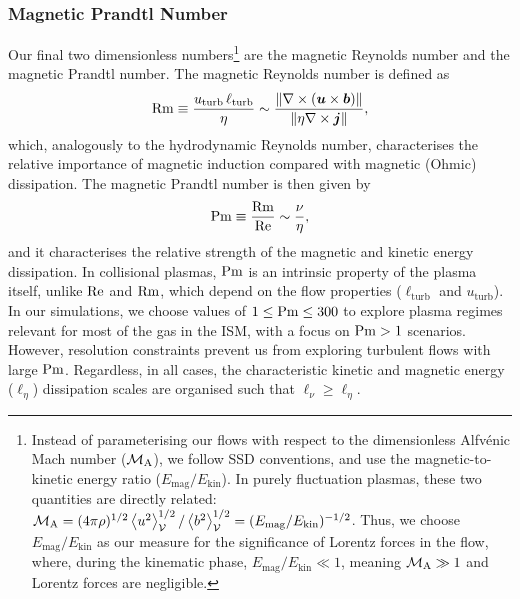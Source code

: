 \subsubsection{Magnetic Prandtl Number}
\label{sec:ICs:Pm}

Our final two dimensionless numbers\footnote{
    Instead of parameterising our flows with respect to the dimensionless Alfv\'enic Mach number ($\mathcal{M}_{\mathrm{A}}$), we follow SSD conventions, and use the magnetic-to-kinetic energy ratio ($E_\mathrm{mag} / E_\mathrm{kin}$). In purely fluctuation plasmas, these two quantities are directly related: $\mathcal{M}_{\mathrm{A}} = (4\pi \rho)^{1/2} \left\langle u^2 \right\rangle_{\mathcal{V}}^{1/2} / \left\langle b^2 \right\rangle_{\mathcal{V}}^{1/2} = (E_\mathrm{mag} / E_\mathrm{kin})^{-1/2}$. Thus, we choose $E_\mathrm{mag} / E_\mathrm{kin}$ as our measure for the significance of Lorentz forces in the flow, where, during the kinematic phase, $E_\mathrm{mag} / E_\mathrm{kin} \ll 1$, meaning $\mathcal{M}_{\mathrm{A}} \gg 1$ and Lorentz forces are negligible.
} are the magnetic Reynolds number and the magnetic Prandtl number. The magnetic Reynolds number is defined as
\begin{align}
    \mathrm{Rm}
        \equiv \frac{u_\mathrm{turb} \,\ell_\mathrm{turb}}{\eta}
        \sim \frac{
                \|\nabla\times(\bm{u}\times\bm{b})\|
            }{
                \|\eta\nabla\times\bm{j}\|
            }
        , \label{dfn:Reym}
\end{align}
which, analogously to the hydrodynamic Reynolds number, characterises the relative importance of magnetic induction compared with magnetic (Ohmic) dissipation. The magnetic Prandtl number is then given by
\begin{align}
    \mathrm{Pm}
        \equiv \frac{\mathrm{Rm}}{\mathrm{Re}}
        \sim \frac{\nu}{\eta}
        , \label{dfn:Pranm}
\end{align}
and it characterises the relative strength of the magnetic and kinetic energy dissipation. In collisional plasmas, $\mathrm{Pm}$ is an intrinsic property of the plasma itself, unlike $\mathrm{Re}$ and $\mathrm{Rm}$, which depend on the flow properties (\ie $\ell_\mathrm{turb}$ and $u_\mathrm{turb}$). In our simulations, we choose values of $1 \leq \mathrm{Pm} \leq 300$ to explore plasma regimes relevant for most of the gas in the ISM, with a focus on $\mathrm{Pm} > 1$ scenarios. However, resolution constraints prevent us from exploring turbulent flows with large $\mathrm{Pm}$. Regardless, in all cases, the characteristic kinetic and magnetic energy ($\ell_\eta$) dissipation scales are organised such that $\ell_\nu \geq \ell_\eta$.

